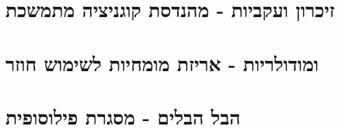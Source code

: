 \documentclass{hebrew-academic-template}
\begin{document}







\newpage
\part{זיכרון ועקביות - מהנדסת קוגניציה מתמשכת}









\newpage
\part{ ומודולריות - אריזת מומחיות לשימוש חוזר}





\newpage
\part{הבל הבלים - מסגרת פילוסופית}






\clearpage







\clearpage
\printenglishbibliography
\end{document}
